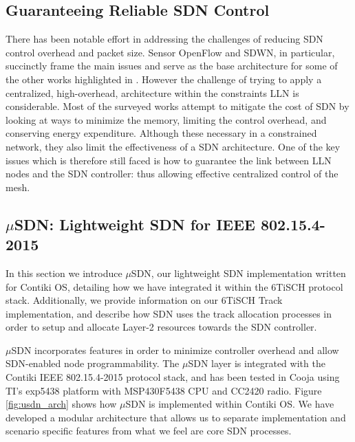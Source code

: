 
\subsection{Guaranteeing Reliable SDN Control}
There has been notable effort in addressing the challenges of reducing SDN control overhead and packet size. Sensor OpenFlow and SDWN, in particular, succinctly frame the main issues and serve as the base architecture for some of the other works highlighted in \cite{wsdn_survey_taxonomy}. However the challenge of trying to apply a centralized, high-overhead, architecture within the constraints LLN is considerable. Most of the surveyed works attempt to mitigate the cost of SDN by looking at ways to minimize the memory, limiting the control overhead, and conserving energy expenditure. Although these necessary in a constrained network, they also limit the effectiveness of a SDN architecture. One of the key issues which is therefore still faced is how to guarantee the link between LLN nodes and the SDN controller: thus allowing effective centralized control of the mesh.



\subsection{$\mu$SDN: Lightweight SDN for IEEE 802.15.4-2015}
\label{sec_motivation_usdn}

In this section we introduce $\mu$SDN, our lightweight SDN implementation written for Contiki OS, detailing how we have integrated it within the 6TiSCH protocol stack. Additionally, we provide information on our 6TiSCH Track implementation, and describe how SDN uses the track allocation processes in order to setup and allocate Layer-2 resources towards the SDN controller.

$\mu$SDN incorporates features in order to minimize controller overhead and allow SDN-enabled node programmability.  The $\mu$SDN layer is integrated with the Contiki IEEE 802.15.4-2015 protocol stack, and has been tested in Cooja using TI's exp5438 platform with MSP430F5438 CPU and CC2420 radio. Figure \ref{fig:usdn_arch} shows how $\mu$SDN is implemented within Contiki OS. We have developed a modular architecture that allows us to separate implementation and scenario specific features from what we feel are core SDN processes.

